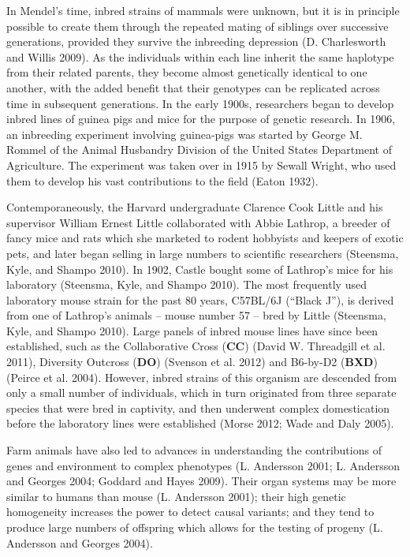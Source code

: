 \documentclass[
]{book}
\begin{document}
In Mendel's time, inbred strains of mammals were unknown, but it is in principle possible to create them through the repeated mating of siblings over successive generations, provided they survive the inbreeding depression (D. Charlesworth and Willis 2009). As the individuals within each line inherit the same haplotype from their related parents, they become almost genetically identical to one another, with the added benefit that their genotypes can be replicated across time in subsequent generations. In the early 1900s, researchers began to develop inbred lines of guinea pigs and mice for the purpose of genetic research. In 1906, an inbreeding experiment involving guinea-pigs was started by George M. Rommel of the Animal Husbandry Division of the United States Department of Agriculture. The experiment was taken over in 1915 by Sewall Wright, who used them to develop his vast contributions to the field (Eaton 1932).

Contemporaneously, the Harvard undergraduate Clarence Cook Little and his supervisor William Ernest Little collaborated with Abbie Lathrop, a breeder of fancy mice and rats which she marketed to rodent hobbyists and keepers of exotic pets, and later began selling in large numbers to scientific researchers (Steensma, Kyle, and Shampo 2010). In 1902, Castle bought some of Lathrop's mice for his laboratory (Steensma, Kyle, and Shampo 2010). The most frequently used laboratory mouse strain for the past 80 years, C57BL/6J (``Black J''), is derived from one of Lathrop's animals -- mouse number 57 -- bred by Little (Steensma, Kyle, and Shampo 2010). Large panels of inbred mouse lines have since been established, such as the Collaborative Cross (\textbf{CC}) (David W. Threadgill et al. 2011), Diversity Outcross (\textbf{DO}) (Svenson et al. 2012) and B6-by-D2 (\textbf{BXD}) (Peirce et al. 2004). However, inbred strains of this organism are descended from only a small number of individuals, which in turn originated from three separate species that were bred in captivity, and then underwent complex domestication before the laboratory lines were established (Morse 2012; Wade and Daly 2005).

Farm animals have also led to advances in understanding the contributions of genes and environment to complex phenotypes (L. Andersson 2001; L. Andersson and Georges 2004; Goddard and Hayes 2009). Their organ systems may be more similar to humans than mouse (L. Andersson 2001); their high genetic homogeneity increases the power to detect causal variants; and they tend to produce large numbers of offspring which allows for the testing of progeny (L. Andersson and Georges 2004).
\end{document}
